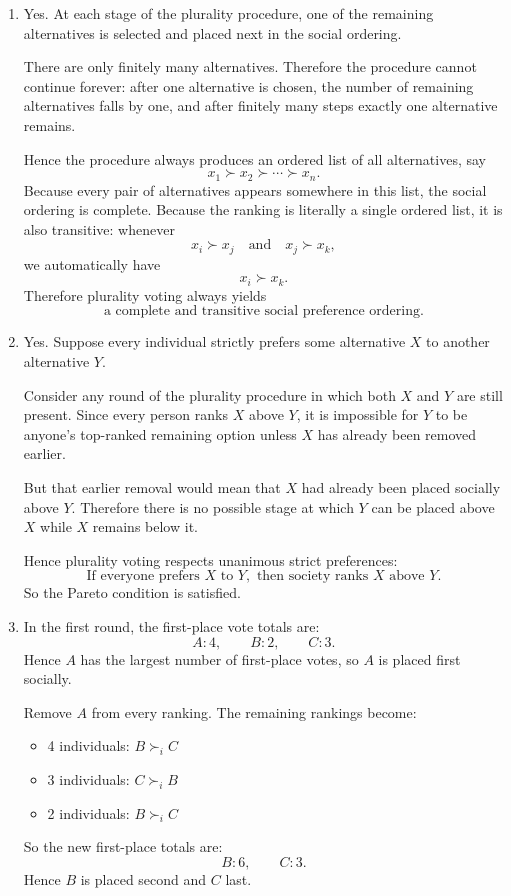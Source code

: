 \documentclass[12pt]{article}
\begin{document}
\begin{enumerate}[label=(\alph*)]
    \item
    Yes. At each stage of the plurality procedure, one of the remaining alternatives is selected and placed next in the social ordering.

    There are only finitely many alternatives. Therefore the procedure cannot continue forever: after one alternative is chosen, the number of remaining alternatives falls by one, and after finitely many steps exactly one alternative remains.

    Hence the procedure always produces an ordered list of all alternatives, say
    \[
    x_1 \succ x_2 \succ \cdots \succ x_n.
    \]
    Because every pair of alternatives appears somewhere in this list, the social ordering is complete. Because the ranking is literally a single ordered list, it is also transitive: whenever
    \[
    x_i \succ x_j \quad\text{and}\quad x_j \succ x_k,
    \]
    we automatically have
    \[
    x_i \succ x_k.
    \]
    Therefore plurality voting always yields
    \[
    \boxed{\text{a complete and transitive social preference ordering.}}
    \]

    \item
    Yes. Suppose every individual strictly prefers some alternative $X$ to another alternative $Y$.

    Consider any round of the plurality procedure in which both $X$ and $Y$ are still present. Since every person ranks $X$ above $Y$, it is impossible for $Y$ to be anyone's top-ranked remaining option unless $X$ has already been removed earlier.

    But that earlier removal would mean that $X$ had already been placed socially above $Y$. Therefore there is no possible stage at which $Y$ can be placed above $X$ while $X$ remains below it.

    Hence plurality voting respects unanimous strict preferences:
    \[
    \boxed{\text{If everyone prefers }X\text{ to }Y,\text{ then society ranks }X\text{ above }Y.}
    \]
    So the Pareto condition is satisfied.

    \item
    In the first round, the first-place vote totals are:
    \[
    A:4,\qquad B:2,\qquad C:3.
    \]
    Hence $A$ has the largest number of first-place votes, so $A$ is placed first socially.

    Remove $A$ from every ranking. The remaining rankings become:
    \begin{itemize}[leftmargin=2em]
        \item 4 individuals: $B \succ_i C$
        \item 3 individuals: $C \succ_i B$
        \item 2 individuals: $B \succ_i C$
    \end{itemize}
    So the new first-place totals are:
    \[
    B:6,\qquad C:3.
    \]
    Hence $B$ is placed second and $C$ last.


\end{enumerate}
\end{document}
